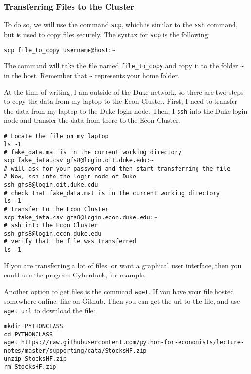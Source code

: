 \documentclass[12pt, a4paper]{article}
\begin{document}
\subsubsection{Transferring Files to the Cluster}
\label{sec:org58e3b13}
To do so, we will use the command \texttt{scp}, which is similar to the \texttt{ssh} command, but is used to copy files securely.
The syntax for \texttt{scp} is the following:
\lstset{language=bash,label= ,caption= ,captionpos=b,firstnumber=1,numbers=left,style=bash}
\begin{lstlisting}
scp file_to_copy username@host:~
\end{lstlisting}
The command will take the file named \texttt{file\_to\_copy} and copy it to the folder \texttt{\textasciitilde{}} in the host.
Remember that \texttt{\textasciitilde{}} represents your home folder.

At the time of writing, I am outside of the Duke network, so there are two steps to copy the data from my laptop to the Econ Cluster.
First, I need to transfer the data from my laptop to the Duke login node.
Then, I \texttt{ssh} into the Duke login node and transfer the data from there to the Econ Cluster.
\lstset{language=bash,label= ,caption= ,captionpos=b,firstnumber=1,numbers=left,style=bash}
\begin{lstlisting}
# Locate the file on my laptop
ls -1
# fake_data.mat is in the current working directory
scp fake_data.csv gfs8@login.oit.duke.edu:~
# will ask for your password and then start transferring the file
# Now, ssh into the login node of Duke
ssh gfs8@login.oit.duke.edu
# check that fake_data.mat is in the current working directory
ls -1
# transfer to the Econ Cluster
scp fake_data.csv gfs8@login.econ.duke.edu:~
# ssh into the Econ Cluster
ssh gfs8@login.econ.duke.edu
# verify that the file was transferred
ls -1
\end{lstlisting}

If you are transferring a lot of files, or want a graphical user interface, then you could use the program \href{https://cyberduck.io}{Cyberduck}, for example.

Another option to get files is the command \texttt{wget}.
If you have your file hosted somewhere online, like on Github.
Then you can get the url to the file, and use \texttt{wget url} to download the file:
\lstset{language=bash,label= ,caption= ,captionpos=b,firstnumber=1,numbers=left,style=bash}
\begin{lstlisting}
mkdir PYTHONCLASS
cd PYTHONCLASS
wget https://raw.githubusercontent.com/python-for-economists/lecture-notes/master/supporting/data/StocksHF.zip
unzip StocksHF.zip
rm StocksHF.zip
\end{lstlisting}
\end{document}
